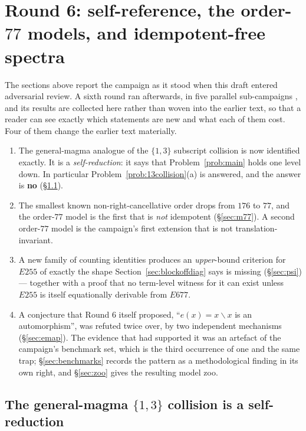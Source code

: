 \documentclass[11pt]{article}
\theoremstyle{plain}
\theoremstyle{definition}
\theoremstyle{remark}
\numberwithin{equation}{section}
\begin{document}
\section{Round 6: self-reference, the order-$77$ models, and idempotent-free
spectra}\label{sec:round6}

The sections above report the campaign as it stood when this draft entered
adversarial review. A sixth round ran afterwards, in five parallel sub-campaigns
\cite{R6A,R6B,R6C,R6D,R6E}, and its results are collected here rather than woven
into the earlier text, so that a reader can see exactly which statements are new
and what each of them cost. Four of them change the earlier text materially.

\begin{enumerate}
\item The general-magma analogue of the $\{1,3\}$ subscript collision is now
identified exactly. It is a \emph{self-reduction}: it says that
Problem~\ref{prob:main} holds one level down. In particular
Problem~\ref{prob:13collision}(a) is answered, and the answer is \textbf{no}
(\S\ref{sec:selfref}).
\item The smallest known non-right-cancellative order drops from $176$ to $77$,
and the order-$77$ model is the first that is \emph{not} idempotent
(\S\ref{sec:m77}). A second order-$77$ model is the campaign's first extension
that is not translation-invariant.
\item A new family of counting identities produces an \emph{upper}-bound
criterion for $E255$ of exactly the shape Section~\ref{sec:blockoffdiag} says is
missing (\S\ref{sec:psi}) --- together with a proof that no term-level witness for
it can exist unless $E255$ is itself equationally derivable from $E677$.
\item A conjecture that Round 6 itself proposed, ``$e(x) = x\backslash x$ is an
automorphism'', was refuted twice over, by two independent mechanisms
(\S\ref{sec:emap}). The evidence that had supported it was an artefact of the
campaign's benchmark set, which is the third occurrence of one and the same trap;
\S\ref{sec:benchmarks} records the pattern as a methodological finding in its own
right, and \S\ref{sec:zoo} gives the resulting model zoo.
\end{enumerate}

\subsection{The general-magma $\{1,3\}$ collision is a self-reduction}\label{sec:selfref}
\end{document}
